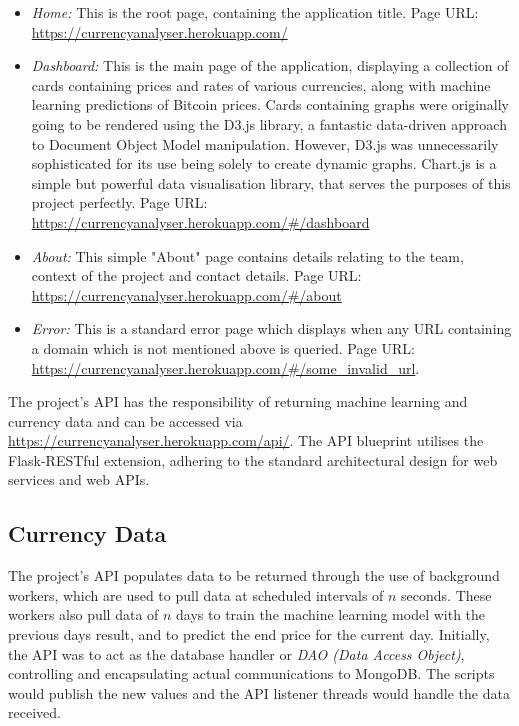 \begin{itemize}
    \item \textit{Home:} This is the root page, containing the application title. Page URL: \textcolor{NavyBlue}{\url{https://currencyanalyser.herokuapp.com/}}
    \item \textit{Dashboard:} This is the main page of the application, displaying a collection of cards containing prices and rates of various currencies, along with machine learning predictions of Bitcoin prices. Cards containing graphs were originally going to be rendered using the D3.js library, a fantastic data-driven approach to Document Object Model manipulation. However, D3.js was unnecessarily sophisticated for its use being solely to create dynamic graphs. Chart.js is a simple but powerful data visualisation library, that serves the purposes of this project perfectly. Page URL: \textcolor{NavyBlue}{\url{https://currencyanalyser.herokuapp.com/#/dashboard}}
    \item \textit{About:} This simple "About" page contains details relating to the team, context of the project and contact details. Page URL:\\ \textcolor{NavyBlue}{\url{https://currencyanalyser.herokuapp.com/#/about}}
    \item \textit{Error:} This is a standard error page which displays when any URL containing a domain which is not mentioned above is queried. Page URL: \textcolor{NavyBlue}{\url{https://currencyanalyser.herokuapp.com/#/some\_invalid\_url}}.
\end{itemize}

The project's API has the responsibility of returning machine learning and currency data and can be accessed via \textcolor{NavyBlue}{\url{https://currencyanalyser.herokuapp.com/api/}}. The API blueprint utilises the Flask-RESTful extension, adhering to the standard architectural design for web services and web APIs.

\subsection{Currency Data}
The project's API populates data to be returned through the use of background workers, which are used to pull data at scheduled intervals of $n$ seconds. These workers also pull data of $n$ days to train the machine learning model with the previous days result, and to predict the end price for the current day. Initially, the API was to act as the database handler or \textit{DAO (Data Access Object)}, controlling and encapsulating actual communications to MongoDB. The scripts would publish the new values and the API listener threads would handle the data received. 

